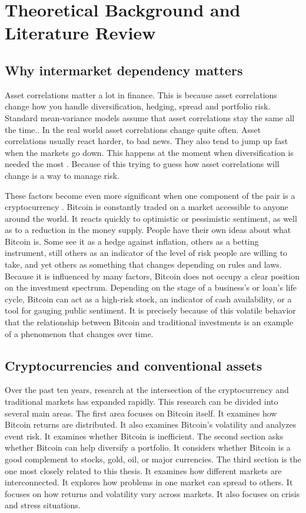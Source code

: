\section{Theoretical Background and Literature Review}

\subsection{Why intermarket dependency matters}

Asset correlations matter a lot in finance. This is because asset correlations change how you handle diversification, hedging, spread and portfolio risk. Standard mean-variance models assume that asset correlations stay the same all the time.. In the real world asset correlations change quite often. Asset correlations usually react harder, to bad news. They also tend to jump up fast when the markets go down. This happens at the moment when diversification is needed the most \cite{longin2001}. Because of this trying to guess how asset correlations will change is a way to manage risk.

These factors become even more significant when one component of the pair is a cryptocurrency \cite{nakamoto2008bitcoin}. Bitcoin is constantly traded on a market accessible to anyone around the world. It reacts quickly to optimistic or pessimistic sentiment, as well as to a reduction in the money supply. People have their own ideas about what Bitcoin is. Some see it as a hedge against inflation, others as a betting instrument, still others as an indicator of the level of risk people are willing to take, and yet others as something that changes depending on rules and laws. Because it is influenced by many factors, Bitcoin does not occupy a clear position on the investment spectrum. Depending on the stage of a business's or loan's life cycle, Bitcoin can act as a high-risk stock, an indicator of cash availability, or a tool for gauging public sentiment. It is precisely because of this volatile behavior that the relationship between Bitcoin and traditional investments is an example of a phenomenon that changes over time.

\subsection{Cryptocurrencies and conventional assets}

Over the past ten years, research at the intersection of the cryptocurrency and traditional markets has expanded rapidly. This research can be divided into several main areas. The first area focuses on Bitcoin itself. It examines how Bitcoin returns are distributed. It also examines Bitcoin's volatility and analyzes event risk. It examines whether Bitcoin is inefficient. The second section asks whether Bitcoin can help diversify a portfolio. It considers whether Bitcoin is a good complement to stocks, gold, oil, or major currencies. The third section is the one most closely related to this thesis. It examines how different markets are interconnected. It explores how problems in one market can spread to others. It focuses on how returns and volatility vary across markets. It also focuses on crisis and stress situations.


